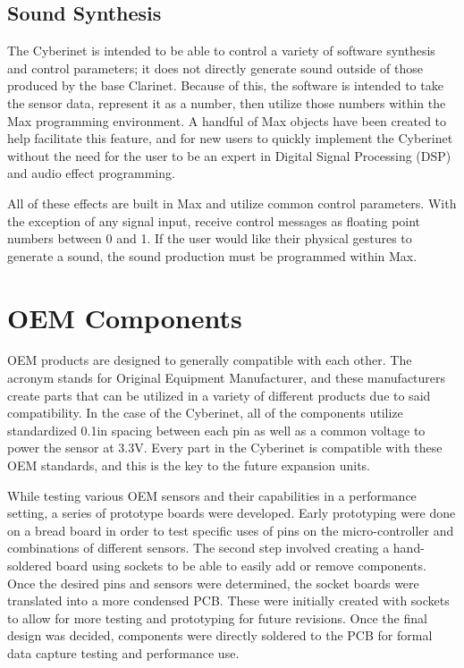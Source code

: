 \subsection{Sound Synthesis} %

The Cyberinet is intended to be able to control a variety of software synthesis and control parameters; it does not directly generate sound outside of those produced by the base Clarinet. Because of this, the software is intended to take the sensor data, represent it as a number, then utilize those numbers within the Max programming environment. A handful of Max objects have been created to help facilitate this feature, and for new users to quickly implement the Cyberinet without the need for the user to be an expert in Digital Signal Processing (DSP) and audio effect programming.

All of these effects are built in Max and utilize common control parameters. With the exception of any signal input, receive control messages as floating point numbers between 0 and 1. If the user would like their physical gestures to generate a sound, the sound production must be programmed within Max.

\section{OEM Components}

OEM products are designed to generally compatible with each other. The acronym stands for Original Equipment Manufacturer, and these manufacturers create parts that can be utilized in a variety of different products due to said compatibility. In the case of the Cyberinet, all of the components utilize standardized 0.1in spacing between each pin as well as a common voltage to power the sensor at 3.3V. Every part in the Cyberinet is compatible with these OEM standards, and this is the key to the future expansion units.

While testing various OEM sensors and their capabilities in a performance setting, a series of prototype boards were developed. Early prototyping were done on a bread board in order to test specific uses of pins on the micro-controller and combinations of different sensors. The second step involved creating a hand-soldered board using sockets to be able to easily add or remove components. Once the desired pins and sensors were determined, the socket boards were translated into a more condensed PCB. These were initially created with sockets to allow for more testing and prototyping for future revisions. Once the final design was decided, components were directly soldered to the PCB for formal data capture testing and performance use.

